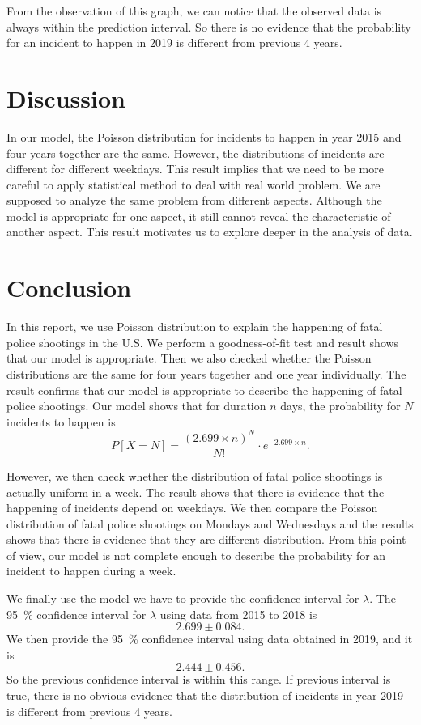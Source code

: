 \documentclass[11pt,a4paper,english]{article}
\begin{document}
From the observation of this graph, we can notice that the observed data is always within the prediction interval. So there is no evidence that the probability for an incident to happen in 2019 is different from previous 4 years.

\section{Discussion}
In our model, the Poisson distribution for incidents to happen in year 2015 and four years together are the same. However, the distributions of incidents are different for different weekdays.  This result implies that we need to be more careful to apply statistical method to deal with real world problem. We are supposed to analyze the same problem from different aspects. Although the model is appropriate for one aspect, it still cannot reveal the characteristic of another aspect. This result motivates us to explore deeper in the analysis of data.

\section{Conclusion}
In this report, we use Poisson distribution to explain the happening of fatal police shootings in the U.S. We perform a goodness-of-fit test and result shows that our model is appropriate. Then we also checked whether the Poisson distributions are the same for four years together and one year individually. The result confirms that our model is appropriate to describe the happening of fatal police shootings. Our model shows that for duration $n$ days, the probability for $N$ incidents to happen is 
\begin{equation*}
	P[X = N] = \frac{(2.699 \times n)^{N}}{N!}\cdot e^{-2.699 \times n}.
\end{equation*}

However, we then check whether the distribution of fatal police shootings is actually uniform in a week. The result shows that there is evidence that the happening of incidents depend on weekdays. We then compare the Poisson distribution of fatal police shootings on Mondays and Wednesdays and the results shows that there is evidence that they are different distribution. From this point of view, our model is not complete enough to describe the probability for an incident to happen during a week.

We finally use the model we have to provide the confidence interval for $\lambda$. The \SI{95}{\percent} confidence interval for $\lambda$ using data from 2015 to 2018 is 
\begin{equation*}
	2.699 \pm 0.084.
\end{equation*}
We then provide the \SI{95}{\percent} confidence interval using data obtained in 2019, and it is
\begin{equation*}
	2.444 \pm 0.456.	
\end{equation*}
So the previous confidence interval is within this range. If previous interval is true, there is no obvious evidence that the distribution of incidents in year 2019 is different from previous 4 years.
\end{document}
